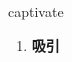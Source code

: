 
\begin{frame}
{\huge captivate}
\begin{center}
\begin{enumerate}\Large
  \item \textbf{吸引}
\end{enumerate}
\end{center}
\end{frame}
